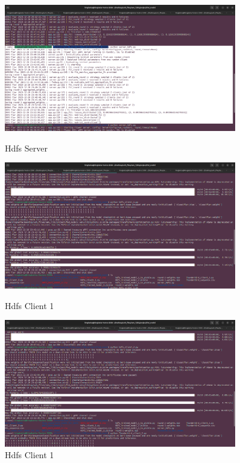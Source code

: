 \documentclass{article}
\begin{document}
\begin{figure}[h]
    \centering
    \includegraphics[width=0.9\textwidth]{hdfs_server.png}
    \caption{Hdfs Server}
    \label{Hdfs Server}
    
    \vspace{\floatsep} %
    
    \includegraphics[width=0.9\textwidth]{hdfs_client_1.png}
    \caption{Hdfs Client 1}
    \label{Hdfs Client 1 Output}
    
    \vspace{\floatsep} %
    
    \includegraphics[width=0.9\textwidth]{hdfs_client_2.png}
    \caption{Hdfs Client 1}
    \label{Hdfs Client 1 Output}
    
\end{figure}
\end{document}

